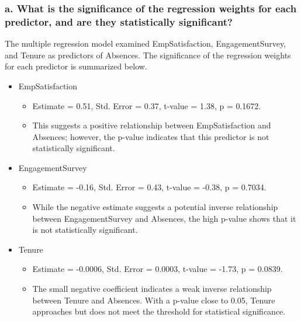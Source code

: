 \documentclass[
]{article}
\providecommand{\tightlist}{%
  \setlength{\itemsep}{0pt}\setlength{\parskip}{0pt}}
\begin{document}
\subsubsection{a. What is the significance of the regression weights for
each predictor, and are they statistically
significant?}\label{a.-what-is-the-significance-of-the-regression-weights-for-each-predictor-and-are-they-statistically-significant-2}

The multiple regression model examined EmpSatisfaction,
EngagementSurvey, and Tenure as predictors of Absences. The significance
of the regression weights for each predictor is summarized below.

\begin{itemize}
\tightlist
\item
  EmpSatisfaction

  \begin{itemize}
  \tightlist
  \item
    Estimate = 0.51, Std. Error = 0.37, t-value = 1.38, p = 0.1672.
  \item
    This suggests a positive relationship between EmpSatisfaction and
    Absences; however, the p-value indicates that this predictor is not
    statistically significant.
  \end{itemize}
\item
  EngagementSurvey

  \begin{itemize}
  \tightlist
  \item
    Estimate = -0.16, Std. Error = 0.43, t-value = -0.38, p = 0.7034.
  \item
    While the negative estimate suggests a potential inverse
    relationship between EngagementSurvey and Absences, the high p-value
    shows that it is not statistically significant.
  \end{itemize}
\item
  Tenure

  \begin{itemize}
  \tightlist
  \item
    Estimate = -0.0006, Std. Error = 0.0003, t-value = -1.73, p =
    0.0839.
  \item
    The small negative coefficient indicates a weak inverse relationship
    between Tenure and Absences. With a p-value close to 0.05, Tenure
    approaches but does not meet the threshold for statistical
    significance.
  \end{itemize}
\end{itemize}
\end{document}

